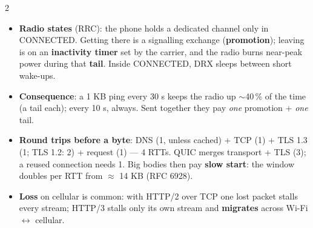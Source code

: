 \documentclass[8pt]{extarticle}
\newcommand\hd[1]{\par\vspace{3pt}\noindent{\bfseries\color{sheetBlue}#1}\par\vspace{1pt}}
\begin{document}

\begin{multicols}{2}
\raggedright{}

\hd{How it works}
\begin{itemize}
  \item \textbf{Radio states} (RRC): the phone holds a dedicated channel only in CONNECTED. Getting
        there is a signalling exchange (\textbf{promotion}); leaving is on an \textbf{inactivity
        timer} set by the carrier, and the radio burns near-peak power during that \textbf{tail}.
        Inside CONNECTED, DRX sleeps between short wake-ups.
  \item \textbf{Consequence}: a 1 KB ping every 30 s keeps the radio up $\sim$40\,\% of the time
        (a tail each); every 10 s, always. Sent together they pay \emph{one} promotion + \emph{one} tail.
  \item \textbf{Round trips before a byte}: DNS (1, unless cached) + TCP (1) + TLS 1.3 (1; TLS 1.2: 2) +
        request (1) — 4 RTTs. QUIC merges transport + TLS (3); a reused connection needs 1. Big
        bodies then pay \textbf{slow start}: the window doubles per RTT from $\approx$ 14 KB (RFC 6928).
  \item \textbf{Loss} on cellular is common: with HTTP/2 over TCP one lost packet stalls every stream;
        HTTP/3 stalls only its own stream and \textbf{migrates} across Wi-Fi $\leftrightarrow$ cellular.
\end{itemize}


\end{multicols}
\end{document}
